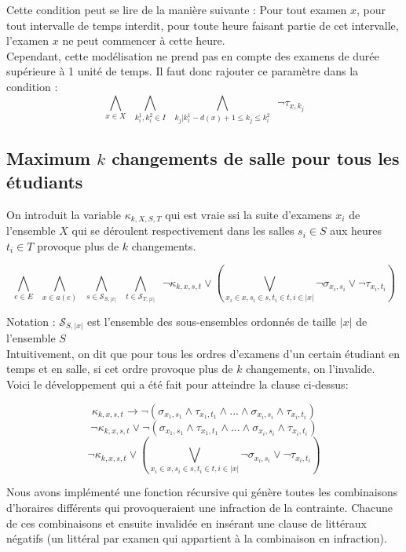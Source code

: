 \documentclass[a4paper]{article}
\begin{document}
Cette condition peut se lire de la manière suivante : Pour tout examen $x$, pour tout intervalle de temps interdit, pour toute heure faisant partie de cet intervalle, l'examen $x$ ne peut commencer à cette heure.\\

Cependant, cette modélisation ne prend pas en compte des examens de durée supérieure à 1 unité de temps. Il faut donc rajouter ce paramètre dans la condition :
$$ \bigwedge\limits_{x \in X} \,\,\,
  \bigwedge\limits_{k_i^1, k_i^2 \in I}\,\,\,
  \bigwedge\limits_{k_j | k_i^1-d(x)+1 \leq k_j \leq k_i^2} \,\,\,
  \lnot \tau_{x,k_j}$$

\subsection{Maximum $k$ changements de salle pour tous les étudiants}
  On introduit la variable $\kappa_{k, X, S, T}$ qui est vraie ssi la suite d'examens $x_i$ de l'ensemble $X$ qui se déroulent respectivement dans les salles $s_i \in S$ aux heures $t_i \in T$ provoque plus de $k$ changements.

  $$  \bigwedge\limits_{e \in E} \,\,\,
      \bigwedge\limits_{x \in a(e)} \,\,\,
      \bigwedge\limits_{s \in \mathcal{S}_{S, |x|}} \,\,\,
      \bigwedge\limits_{t \in \mathcal{S}_{T, |x|}} \,\,\,
      \lnot \kappa_{k, x, s, t} \lor
      (\bigvee\limits_{x_i \in x, s_i \in s, t_i \in t, i \in |x|} 
       \lnot \sigma_{x_i, s_i} \lor \lnot \tau_{x_i, t_i}) $$

  Notation : $\mathcal{S}_{S, |x|}$ est l'ensemble des sous-ensembles ordonnés de taille $|x|$ de l'ensemble $S$\\

  Intuitivement, on dit que pour tous les ordres d'examens d'un certain étudiant en temps et en salle, si cet ordre provoque plus de $k$ changements, on l'invalide. Voici le développement qui a été fait pour atteindre la clause ci-dessus:

    $$ \kappa_{k, x, s, t} \rightarrow \lnot (\sigma_{x_1, s_1} \land \tau_{x_1, t_1} \land ... \land \sigma_{x_i, s_i} \land \tau_{x_i, t_i}) $$
    $$ \lnot \kappa_{k, x, s, t} \lor \lnot (\sigma_{x_1, s_1} \land \tau_{x_1, t_1} \land ... \land \sigma_{x_i, s_i} \land \tau_{x_i, t_i}) $$
    $$ \lnot \kappa_{k, x, s, t} \lor (\bigvee\limits_{x_i \in x, s_i \in s, t_i \in t, i \in |x|} \lnot \sigma_{x_i, s_i} \lor \lnot \tau_{x_i, t_i}) $$


  Nous avons implémenté une fonction récursive qui génère toutes les combinaisons d'horaires différents qui provoqueraient une infraction de la contrainte. Chacune de ces combinaisons et ensuite invalidée en insérant une clause de littéraux négatifs (un littéral par examen qui appartient à la combinaison en infraction).
\end{document}
